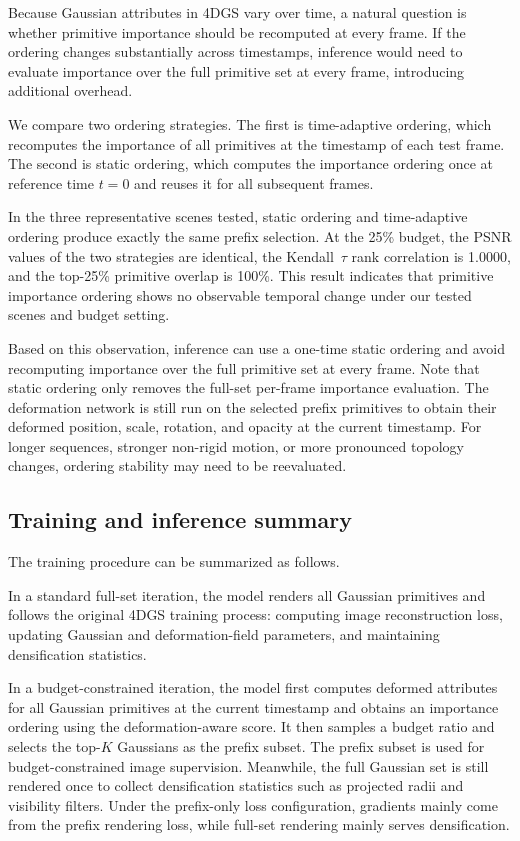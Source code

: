 \documentclass[pdflatex,sn-mathphys]{sn-jnl}
\begin{document}
Because Gaussian attributes in 4DGS vary over time, a natural question is whether primitive importance should be recomputed at every frame. If the ordering changes substantially across timestamps, inference would need to evaluate importance over the full primitive set at every frame, introducing additional overhead.

We compare two ordering strategies. The first is time-adaptive ordering, which recomputes the importance of all primitives at the timestamp of each test frame. The second is static ordering, which computes the importance ordering once at reference time $t=0$ and reuses it for all subsequent frames.

In the three representative scenes tested, static ordering and time-adaptive ordering produce exactly the same prefix selection. At the 25\% budget, the PSNR values of the two strategies are identical, the Kendall~$\tau$ rank correlation is 1.0000, and the top-25\% primitive overlap is 100\%. This result indicates that primitive importance ordering shows no observable temporal change under our tested scenes and budget setting.

Based on this observation, inference can use a one-time static ordering and avoid recomputing importance over the full primitive set at every frame. Note that static ordering only removes the full-set per-frame importance evaluation. The deformation network is still run on the selected prefix primitives to obtain their deformed position, scale, rotation, and opacity at the current timestamp. For longer sequences, stronger non-rigid motion, or more pronounced topology changes, ordering stability may need to be reevaluated.

\subsection{Training and inference summary}
\label{sec:summary}

The training procedure can be summarized as follows.

In a standard full-set iteration, the model renders all Gaussian primitives and follows the original 4DGS training process: computing image reconstruction loss, updating Gaussian and deformation-field parameters, and maintaining densification statistics.

In a budget-constrained iteration, the model first computes deformed attributes for all Gaussian primitives at the current timestamp and obtains an importance ordering using the deformation-aware score. It then samples a budget ratio and selects the top-$K$ Gaussians as the prefix subset. The prefix subset is used for budget-constrained image supervision. Meanwhile, the full Gaussian set is still rendered once to collect densification statistics such as projected radii and visibility filters. Under the prefix-only loss configuration, gradients mainly come from the prefix rendering loss, while full-set rendering mainly serves densification.
\end{document}
